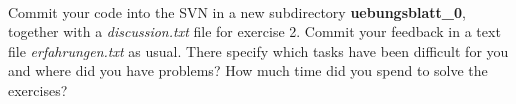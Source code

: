 \\
Commit your code into the SVN in a new subdirectory 
\textbf{uebungsblatt\_0\ExerciseSheetNumber}, together with a \emph{discussion.txt} file for exercise 2. Commit your feedback in a text file 
\emph{erfahrungen.txt} as usual. There specify which tasks have been difficult for you and where did you have problems? How much time did you spend to solve the exercises?
